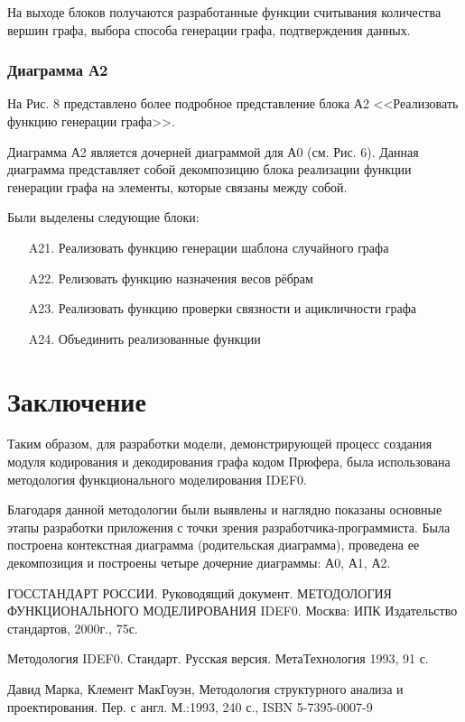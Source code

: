 \documentclass[a4paper, final]{article}
\begin{document}
На выходе блоков получаются разработанные функции считывания количества вершин графа, выбора способа генерации графа,
подтверждения данных.

\newpage
\hypertarget{img:A1}{}



\subsubsection{Диаграмма А2}
На Рис. 8 представлено более подробное представление блока А2 <<Реализовать функцию генерации графа>>.

Диаграмма А2 является дочерней диаграммой для А0 (см. Рис. 6). Данная диаграмма представляет собой декомпозицию
блока реализации функции генерации графа на элементы, которые связаны между собой. 

Были выделены следующие блоки:
\begin{itemize}
	\item[A21.] Реализовать функцию генерации шаблона случайного графа
	\item[A22.] Релизовать функцию назначения весов рёбрам
	\item[A23.] Реализовать функцию проверки связности и ацикличности графа
	\item[A24.] Объединить реализованные функции
\end{itemize} 

\newpage
\hypertarget{img:A2}{}



\cleardoublepage
{}
\newpage
{}
\section*{Заключение}
Таким образом, для разработки модели, демонстрирующей процесс создания модуля кодирования и декодирования графа кодом Прюфера,
была использована методология функционального моделирования IDEF0.

Благодаря данной методологии были выявлены и наглядно показаны основные этапы разработки приложения с точки зрения 
разработчика-программиста. Была построена контекстная диаграмма (родительская диаграмма), проведена ее декомпозиция и 
построены четыре дочерние диаграммы: А0, А1, А2. 

\cleardoublepage
{}
\newpage
\begin{thebibliography}{0}
	ГОССТАНДАРТ РОССИИ. Руководящий документ. МЕТОДОЛОГИЯ ФУНКЦИОНАЛЬНОГО МОДЕЛИРОВАНИЯ IDEF0. 
	Москва: ИПК Издательство стандартов, 2000г., 75с.

	Методология IDEF0. Стандарт. Русская версия. МетаТехнология 1993, 91 с.

  Давид Марка, Клемент МакГоуэн, Методология структурного анализа и проектирования. Пер. с англ. М.:1993, 240 с., ISBN 5-7395-0007-9
\end{thebibliography}
\end{document}
